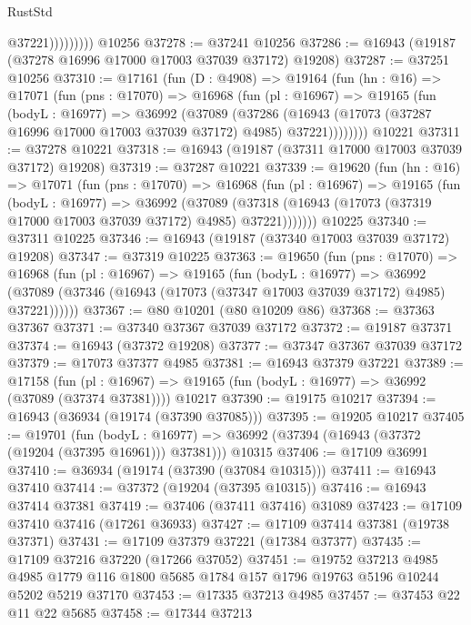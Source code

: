 \begin{lexlean}{RustStd}
\begin{coremodule}
                      @37221)))))))))
    @10256
@37278 := @37241 @10256
@37286 := @16943 (@19187 (@37278 @16996 @17000 @17003 @37039 @37172) @19208)
@37287 := @37251 @10256
@37310 := @17161
    (fun (D : @4908) =>
    @19164
      (fun (hn : @16) =>
      @17071
        (fun (pns : @17070) =>
        @16968
          (fun (pl : @16967) =>
          @19165
            (fun (bodyL : @16977) =>
            @36992
              (@37089
                (@37286
                  (@16943 (@17073 (@37287 @16996 @17000 @17003 @37039 @37172) @4985) @37221))))))))
    @10221
@37311 := @37278 @10221
@37318 := @16943 (@19187 (@37311 @17000 @17003 @37039 @37172) @19208)
@37319 := @37287 @10221
@37339 := @19620
    (fun (hn : @16) =>
    @17071
      (fun (pns : @17070) =>
      @16968
        (fun (pl : @16967) =>
        @19165
          (fun (bodyL : @16977) =>
          @36992
            (@37089
              (@37318 (@16943 (@17073 (@37319 @17000 @17003 @37039 @37172) @4985) @37221)))))))
    @10225
@37340 := @37311 @10225
@37346 := @16943 (@19187 (@37340 @17003 @37039 @37172) @19208)
@37347 := @37319 @10225
@37363 := @19650
    (fun (pns : @17070) =>
    @16968
      (fun (pl : @16967) =>
      @19165
        (fun (bodyL : @16977) =>
        @36992 (@37089 (@37346 (@16943 (@17073 (@37347 @17003 @37039 @37172) @4985) @37221))))))
@37367 := @80 @10201 (@80 @10209 @86)
@37368 := @37363 @37367
@37371 := @37340 @37367 @37039 @37172
@37372 := @19187 @37371
@37374 := @16943 (@37372 @19208)
@37377 := @37347 @37367 @37039 @37172
@37379 := @17073 @37377 @4985
@37381 := @16943 @37379 @37221
@37389 := @17158
    (fun (pl : @16967) => @19165 (fun (bodyL : @16977) => @36992 (@37089 (@37374 @37381))))
    @10217
@37390 := @19175 @10217
@37394 := @16943 (@36934 (@19174 (@37390 @37085)))
@37395 := @19205 @10217
@37405 := @19701
    (fun (bodyL : @16977) => @36992 (@37394 (@16943 (@37372 (@19204 (@37395 @16961))) @37381)))
    @10315
@37406 := @17109 @36991
@37410 := @36934 (@19174 (@37390 (@37084 @10315)))
@37411 := @16943 @37410
@37414 := @37372 (@19204 (@37395 @10315))
@37416 := @16943 @37414 @37381
@37419 := @37406 (@37411 @37416) @31089
@37423 := @17109 @37410 @37416 (@17261 @36933)
@37427 := @17109 @37414 @37381 (@19738 @37371)
@37431 := @17109 @37379 @37221 (@17384 @37377)
@37435 := @17109 @37216 @37220 (@17266 @37052)
@37451 := @19752
    @37213
    @4985
    @4985
    @1779
    @116
    @1800
    @5685
    @1784
    @157
    @1796
    @19763
    @5196
    @10244
    @5202
    @5219
    @37170
@37453 := @17335 @37213 @4985
@37457 := @37453 @22 @11 @22 @5685
@37458 := @17344 @37213

\end{coremodule}
\end{lexlean}
